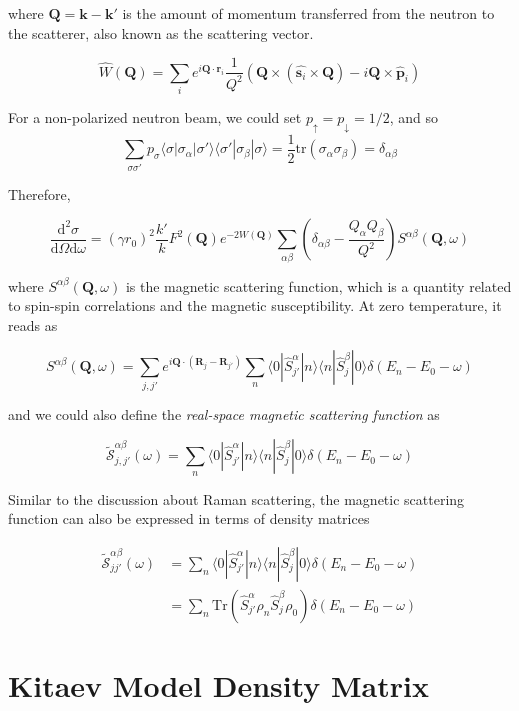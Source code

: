 \documentclass[12font]{article}
\newcommand{\bra}[1]{\langle #1 |}
\newcommand{\ket}[1]{| #1 \rangle}
\newcommand{\lr}[1]{\left(  #1  \right)}
\newcommand{\mrm}[1]{\mathrm{#1}}
\newcommand{\bo}[1]{\mathbf{#1}}
\newcommand{\Tr}{\mrm{Tr}}
\begin{document}
where $\bo{Q} = \bo{k} - \bo{k}'$ is the amount of momentum transferred from the neutron to the scatterer, also known as the scattering vector.

$$
\hat{W}(\bo{Q}) = \sum_{i} e^{i\bo{Q}\cdot \bo{r}_i} \frac{1}{Q^2} \lr{\bo{Q}\times \lr{\hat{\bo{s}_i}\times \bo{Q}} - i\bo{Q}\times\hat{\bo{p}}_i}
$$

For a non-polarized neutron beam, we could set $p_\uparrow = p_\downarrow = 1/2$, and so
$$
\sum_{\sigma\sigma'}p_\sigma \bra{\sigma}\sigma_\alpha\ket{\sigma'}\bra{\sigma'}\sigma_\beta\ket{\sigma} = \frac{1}{2}\mathrm{tr}(\sigma_\alpha\sigma_\beta) = \delta_{\alpha\beta}
$$

Therefore, 

$$
\frac{\mrm{d}^2 \sigma}{\mrm{d}\Omega\mrm{d}\omega} = (\gamma r_0)^2 \frac{k'}{k} F^2(\bo{Q}) e^{-2W(\bo{Q})} \sum_{\alpha\beta}\lr{\delta_{\alpha\beta} - \frac{Q_\alpha Q_\beta}{Q^2}} S^{\alpha\beta}(\bo{Q},\omega)
$$

where $S^{\alpha\beta}(\bo{Q},\omega)$ is the magnetic scattering function, which is a quantity related to spin-spin correlations and the magnetic susceptibility. At zero temperature, it reads as

$$
S^{\alpha\beta}(\bo{Q},\omega) = 
\sum_{j,j'} 
e^{i\bo{Q}\cdot\lr{\bo{R}_j - \bo{R}_{j'}}} 
\sum_{n}
\bra{0} \hat{S}^\alpha_{j'} \ket{n} 
\bra{n} \hat{S}^\beta_j \ket{0} 
\delta(E_n - E_0 - \omega)
$$

and we could also define the \textit{real-space magnetic scattering function} as

$$
\tilde{\mathcal{S}}^{\alpha\beta}_{j,j'}(\omega) = 
\sum_{n}
\bra{0} \hat{S}^\alpha_{j'} \ket{n} 
\bra{n} \hat{S}^\beta_j \ket{0} 
\delta(E_n - E_0 - \omega)
$$

Similar to the discussion about Raman scattering, the magnetic scattering function can also be expressed in terms of density matrices

\begin{align*}
\tilde{\mathcal{S}}_{jj'}^{\alpha\beta}(\omega) 
&= 
\sum_{n}
\bra{0} \hat{S}^\alpha_{j'} \ket{n} 
\bra{n} \hat{S}^\beta_j \ket{0} 
\delta(E_n - E_0 - \omega) \\
&= \sum_{n}
\Tr \lr{ 
    \hat{S}^\alpha_{j'} \rho_n \hat{S}^\beta_j \rho_0
}
\delta(E_n - E_0 - \omega)
\end{align*}

\section{Kitaev Model Density Matrix}





\end{document}
